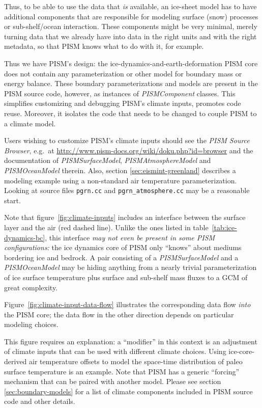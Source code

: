 \documentclass[titlepage,letterpaper,final]{scrartcl}
\newcommand{\PISMBROWSERURL}{http://www.pism-docs.org/wiki/doku.php?id=browser}
\begin{document}
Thus, to be able to use the data that \emph{is} available, an ice-sheet model has to
have additional components that are responsible for modeling surface (snow)
processes or sub-shelf/ocean interaction.  These components might be very minimal, merely turning data that we already have into data in the right units and with the right metadata, so that PISM knows what to do with it, for example.

Thus we have PISM's design: the ice-dynamics-and-earth-deformation PISM
core does not contain any parameterization or other model for boundary mass or
energy balance.  These boundary parameterizations and models are present in the PISM source code, however, as instances of \emph{PISMComponent} classes.  This simplifies customizing and debugging PISM's climate
inputs, promotes code reuse.  Moreover, it isolates the code that needs to be changed to
couple PISM to a climate model.

Users wishing to customize PISM's climate inputs should see the \emph{PISM
  Source Browser}, e.g.~at
\url{\PISMBROWSERURL} and the documentation
of \emph{PISMSurfaceModel}, \emph{PISMAtmosphereModel} and
\emph{PISMOceanModel} therein.  Also, section \ref{sec:eismint-greenland} describes a
modeling example using a non-standard air temperature parameterization. Looking
at source files \texttt{pgrn.cc} and \texttt{pgrn_atmosphere.cc} may be a reasonable
start.

Note that figure~\ref{fig:climate-inputs} includes an interface between the surface layer and the air (red dashed line).
Unlike the ones listed in table~\ref{tab:ice-dynamics-bc}, this interface
\emph{may not even be present in some PISM configurations:} the ice dynamics
core of PISM only ``knows'' about mediums bordering ice and bedrock. A pair
consisting of a \emph{PISMSurfaceModel} and a \emph{PISMOceanModel} may be
hiding anything from a nearly trivial parameterization of ice surface
temperature plus surface and sub-shelf mass fluxes to a GCM of great
complexity.

Figure~\ref{fig:climate-input-data-flow} illustrates the corresponding data
flow \emph{into} the PISM core; the data flow in the other direction depends on
particular modeling choices.

This figure requires an explanation: a ``modifier'' in this context is an
adjustment of climate inputs that can be used with different climate
choices.  Using ice-core-derived air temperature offsets to model the space-time distribution of paleo surface temperature is an example.  Note that PISM has a generic ``forcing'' mechanism that can be paired with another model. Please see section \ref{sec:boundary-models} for
a list of climate components included in PISM source code and other details.
\end{document}
